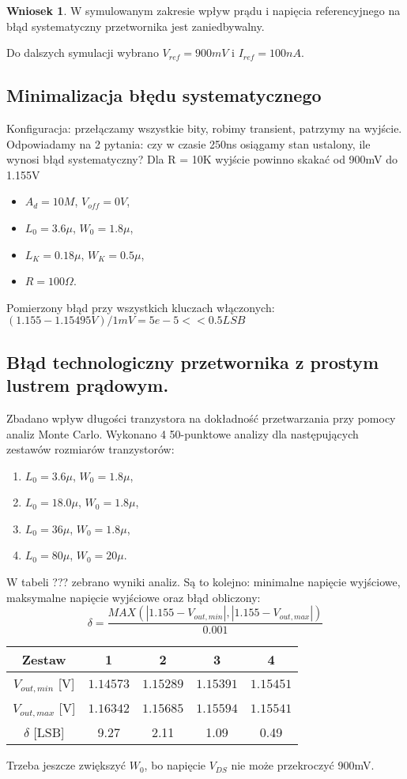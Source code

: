 \documentclass[10pt,a4paper,twoside]{report}
\theoremstyle{definition}
\theoremstyle{definition}
\theoremstyle{definition}
\theoremstyle{definition}
\theoremstyle{definition}
\newtheorem{wniosek}{Wniosek}[section]
\begin{document}
{{	\begin{wniosek}{W symulowanym zakresie wpływ prądu i napięcia referencyjnego na błąd systematyczny przetwornika jest zaniedbywalny. }
		
	\end{wniosek}

	{	Do dalszych symulacji wybrano $V_{ref} = 900mV$ i $I_{ref} = 100nA$. }


	\subsection{Minimalizacja błędu systematycznego}
	{	Konfiguracja: przełączamy wszystkie bity, robimy transient, patrzymy na wyjście. Odpowiadamy na 2 pytania: czy w czasie 250ns osiągamy stan ustalony, ile wynosi błąd systematyczny? Dla R = 10K wyjście powinno skakać od 900mV do 1.155V}
	
	\begin{itemize}
		\item $A_d = 10M$, $V_{off} = 0V$,
		\item $L_0 = 3.6\mu$, $W_0 = 1.8\mu$,
		\item $L_K = 0.18\mu$, $W_K = 0.5\mu$,
		\item $R = 100 \Omega$.
	\end{itemize}
	{ Pomierzony błąd przy wszystkich kluczach włączonych: $(1.155 - 1.15495V) / 1mV = 5e-5 << 0.5 LSB$ }
	\subsection{Błąd technologiczny przetwornika z prostym lustrem prądowym.}
	{	Zbadano wpływ długości tranzystora na dokładność przetwarzania przy pomocy analiz Monte Carlo. Wykonano 4 50-punktowe analizy dla następujących zestawów rozmiarów tranzystorów:
		\begin{enumerate}
			\item $L_0 = 3.6\mu$, $W_0 = 1.8\mu$,
			\item $L_0 = 18.0\mu$, $W_0 = 1.8\mu$,
			\item $L_0 = 36\mu$, $W_0 = 1.8\mu$,
			\item $L_0 = 80\mu$, $W_0 = 20\mu$.
		\end{enumerate}
	W tabeli ??? zebrano wyniki analiz. Są to kolejno: minimalne napięcie wyjściowe, maksymalne napięcie wyjściowe oraz błąd obliczony:
	$$
	\delta = \frac{MAX(|1.155-V_{out,min}|,|1.155-V_{out,max}|)}{0.001}
	$$
		\begin{center}
		\begin{tabular}{|c|c|c|c|c|}
			\hline 
			Zestaw & 1 & 2 & 3  & 4\\ 
			\hline 
			$V_{out,min}$ [V] & $1.14573$ & $1.15289$ & $1.15391$ & $1.15451$ \\ 
			\hline
			$V_{out,max}$ [V] & $1.16342$ & $1.15685$ & $1.15594$ & $1.15541$\\ 
			\hline 
			$\delta$ [LSB]  & 9.27 & 2.11 & 1.09 & 0.49\\
			\hline
		\end{tabular} 
	\end{center}
	Trzeba jeszcze zwiększyć $W_0$, bo napięcie $V_{DS}$ nie może przekroczyć 900mV.
	
}}}
\end{document}
